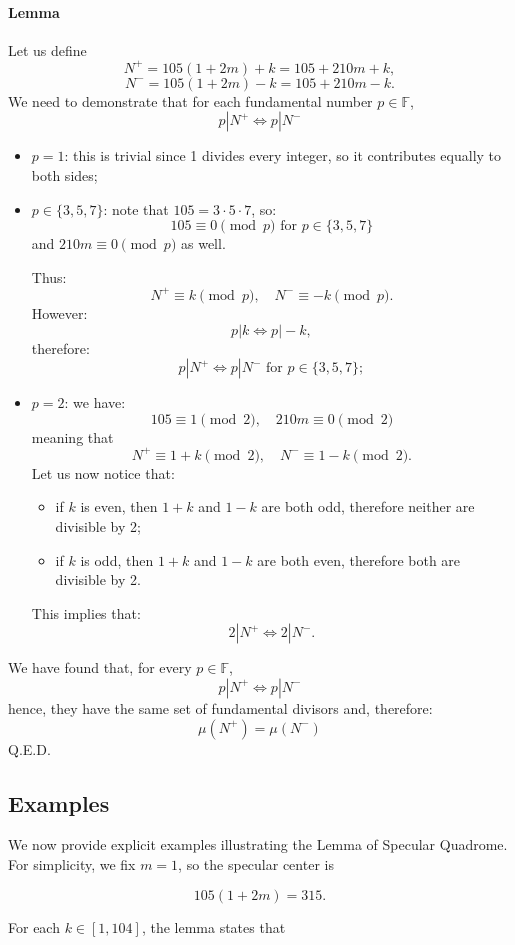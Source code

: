 \documentclass{article}
\begin{document}
\paragraph{Lemma}
Let us define
$$
N^+ = 105(1+2m)+k= 105+210m+k,
$$
$$
N^-=105(1+2m)-k=105+210m-k.
$$
We need to demonstrate that for each fundamental number $p\in\mathbb{F}$,
$$
p|N^+ \Leftrightarrow p|N^-
$$
\begin{itemize}
    \item $p=1$: this is trivial since 1 divides every integer, so it contributes equally to both sides;
    \item $p\in\{3,5,7\}$: note that $105 = 3\cdot 5\cdot 7$, so:
    $$
    105 \equiv 0 \pmod p \text{ for } p\in\{3,5,7\}
    $$ 
    and $210m\equiv 0 \pmod p$ as well.
    
    Thus:
    $$
    N^+ \equiv k \pmod p, \quad N^-\equiv -k \pmod p.
    $$
    However:
    $$
    p|k \Leftrightarrow p|-k,
    $$
    therefore:
    $$
    p|N^+ \Leftrightarrow p|N^- \text{ for } p\in\{3,5,7\};
    $$
    \item $p=2$: we have:
    $$
    105 \equiv 1 \pmod 2, \quad 210m \equiv 0 \pmod 2
    $$
    meaning that
    $$
    N^+ \equiv 1+k \pmod 2, \quad N^- \equiv 1-k \pmod 2.
    $$
    Let us now notice that:
    \begin{itemize}
        \item if $k$ is even, then $1+k$ and $1-k$ are both odd, therefore neither are divisible by 2;
        \item if $k$ is odd, then $1+k$ and $1-k$ are both even, therefore both are divisible by 2.
    \end{itemize}
    This implies that:
    $$
    2|N^+ \Leftrightarrow 2|N^-.
    $$
\end{itemize}
We have found that, for every $p\in \mathbb{F}$,
$$
p|N^+ \Leftrightarrow p|N^-
$$
hence, they have the same set of fundamental divisors and, therefore:
$$
\mu(N^+) = \mu(N^-)
$$
Q.E.D.

\subsection{Examples}

We now provide explicit examples illustrating the Lemma of Specular Quadrome.
For simplicity, we fix $m = 1$, so the specular center is

\[
105(1 + 2m) = 315.
\]

For each $k \in [1,104]$, the lemma states that
\end{document}
